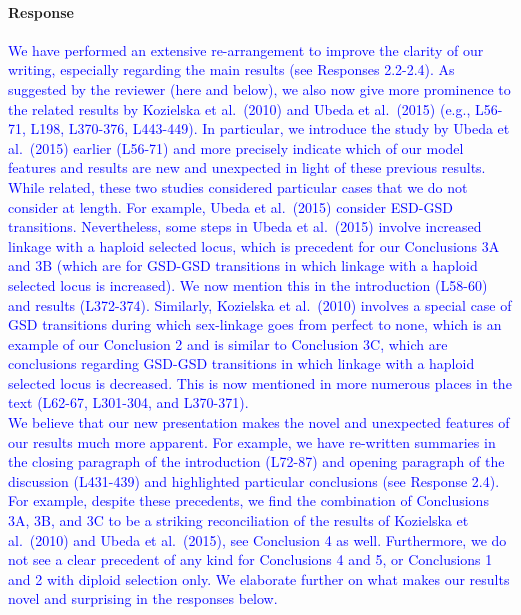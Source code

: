 \documentclass[10pt,letterpaper]{article}
\begin{document}
\noindent\paragraph{Response}
\textcolor{blue}{
We have performed an extensive re-arrangement to improve the clarity of our writing, especially regarding the main results (see Responses 2.2-2.4). 
As suggested by the reviewer (here and below), we also now give more prominence to the related results by Kozielska et al.\ (2010) and Ubeda et al.\ (2015) (e.g., L56-71, L198, L370-376, L443-449). 
In particular, we introduce the study by Ubeda et al.\ (2015) earlier (L56-71) and more precisely indicate which of our model features and results are new and unexpected in light of these previous results.
\\
\indent
While related, these two studies considered particular cases that we do not consider at length. 
For example, Ubeda et al.\ (2015) consider ESD-GSD transitions. 
Nevertheless, some steps in Ubeda et al.\ (2015) involve increased linkage with a haploid selected locus, which is precedent for our Conclusions 3A and 3B (which are for GSD-GSD transitions in which linkage with a haploid selected locus is increased).
We now mention this in the introduction (L58-60) and results (L372-374). %
Similarly, Kozielska et al.\ (2010) involves a special case of GSD transitions during which sex-linkage goes from perfect to none, which is an example of our Conclusion 2 and is similar to Conclusion 3C, which are conclusions regarding GSD-GSD transitions in which linkage with a haploid selected locus is decreased.
This is now mentioned in more numerous places in the text (L62-67, L301-304, and L370-371). 
\\
\indent
We believe that our new presentation makes the novel and unexpected features of our results much more apparent. 
For example, we have re-written summaries in the closing paragraph of the introduction (L72-87) and opening paragraph of the discussion (L431-439) and highlighted particular conclusions (see Response 2.4). 
For example, despite these precedents, we find the combination of Conclusions 3A, 3B, and 3C to be a striking reconciliation of the results of Kozielska et al.\ (2010) and Ubeda et al.\ (2015), see Conclusion 4 as well. 
Furthermore, we do not see a clear precedent of any kind for Conclusions 4 and 5, or Conclusions 1 and 2 with diploid selection only. 
We elaborate further on what makes our results novel and surprising in the responses below.
}
\end{document}

